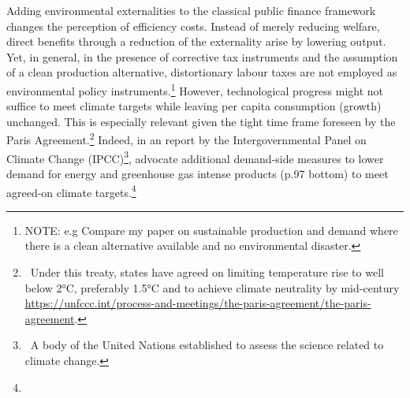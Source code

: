  Adding environmental externalities to the classical public finance framework changes the perception of efficiency costs. Instead of merely reducing welfare, direct benefits through a reduction of the externality arise by lowering output. 
Yet, in general, in the presence of corrective tax instruments and the assumption of a clean production alternative, %
distortionary labour taxes are not employed as environmental policy instruments.\footnote{ NOTE: e.g Compare my paper on sustainable production and demand where there is a clean alternative available and no environmental disaster.} 
However, technological progress might not suffice to meet climate targets while leaving per capita consumption (growth) unchanged. This is especially relevant given the tight time frame foreseen by the Paris Agreement.\footnote{\ Under this treaty, states have agreed on limiting temperature rise to well below 2°C, preferably 1.5°C and to achieve climate neutrality by mid-century \url{https://unfccc.int/process-and-meetings/the-paris-agreement/the-paris-agreement}. } Indeed, in an report by the Intergovernmental Panel on Climate Change (IPCC)\footnote{\ A body of the United Nations established to assess the science related to climate change.},  \cite{Rogelj2018MitigationDevelopment.} advocate additional demand-side measures to lower demand for energy and greenhouse gas intense products (p.97 bottom) to meet agreed-on climate targets.\footnote{}

% 

